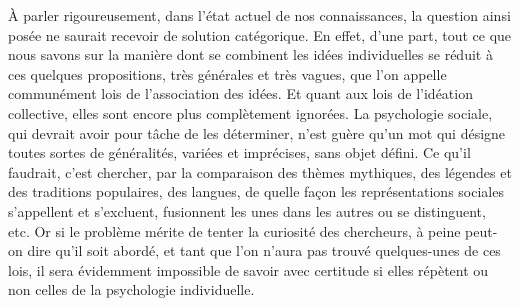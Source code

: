 \documentclass[french,twoside]{book} %
\begin{document}
À parler rigoureusement, dans l’état actuel de nos connaissances, la question ainsi posée ne saurait recevoir de solution catégorique. En effet, d’une part, tout ce que nous savons sur la manière dont se combinent les idées individuelles se réduit à ces quelques propositions, très générales et très vagues, que l’on appelle communément lois de l’association des idées. Et quant aux lois de l’idéation collective, elles sont encore plus complètement ignorées. La psychologie sociale, qui devrait avoir pour tâche de les déterminer, n’est guère qu’un mot qui désigne toutes sortes de généralités, variées et imprécises, sans objet défini. Ce qu’il faudrait, c’est chercher, par la comparaison des thèmes mythiques, des légendes et des traditions populaires, des langues, de quelle façon les représentations sociales s’appellent et s’excluent, fusionnent les unes dans les autres ou se distinguent, etc. Or si le problème mérite de tenter la curiosité des chercheurs, à peine peut-on dire qu’il soit abordé, et tant que l’on n’aura pas trouvé quelques-unes de ces lois, il sera évidemment impossible de savoir avec certitude si elles répètent ou non celles de la psychologie individuelle.\par
\end{document}
